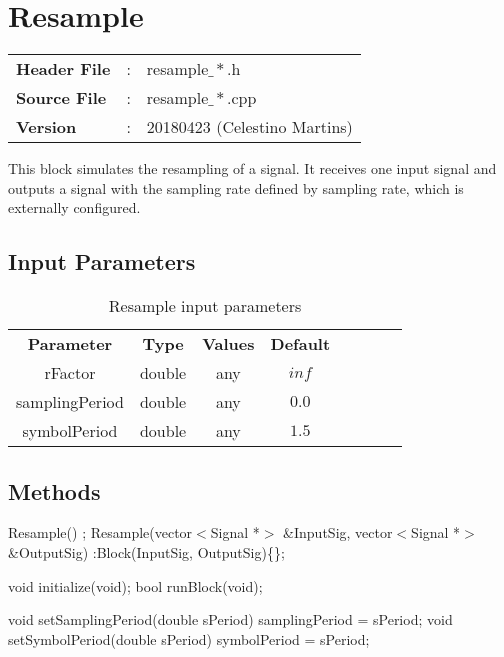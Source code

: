 \clearpage

\section{Resample}

\begin{tcolorbox}	
	\begin{tabular}{p{2.75cm} p{0.2cm} p{10.5cm}} 	
		\textbf{Header File}   &:& resample$\_*$.h \\
		\textbf{Source File}   &:& resample$\_*$.cpp \\
        \textbf{Version}       &:& 20180423 (Celestino Martins) \\
	\end{tabular}
\end{tcolorbox}

This block simulates the resampling of a signal. It receives one input signal and outputs a signal with the sampling rate defined by sampling rate, which is externally configured.

\subsection*{Input Parameters}

\begin{table}[h]
	\centering
	\begin{tabular}{|c|c|c|c|cccc}
		\cline{1-4}
		\textbf{Parameter} & \textbf{Type} & \textbf{Values} &   \textbf{Default}& \\ \cline{1-4}
		rFactor           & double & any & $inf$ \\ \cline{1-4}
		samplingPeriod    & double & any & $0.0$ \\ \cline{1-4}	
        symbolPeriod      & double & any & $1.5$ \\ \cline{1-4}	
	\end{tabular}
	\caption{Resample input parameters}
	\label{table:resample_in_par}
\end{table}


\subsection*{Methods}

Resample() {};
Resample(vector$<$Signal *$>$ \&InputSig, vector$<$Signal *$>$ \&OutputSig) :Block(InputSig, OutputSig)\{\};

void initialize(void);
bool runBlock(void);

void setSamplingPeriod(double sPeriod) { samplingPeriod = sPeriod; }
void setSymbolPeriod(double sPeriod) { symbolPeriod = sPeriod; }

